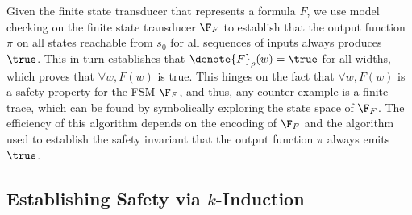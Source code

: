 Given the finite state transducer that represents a formula $F$,
we use model checking on the finite state transducer $\F_F$ to establish that the
output function $\pi$ on all states reachable from $s_0$ for all sequences of inputs always produces $\true$.
This in turn establishes that $\denote{F}_\rho(w) = \true$ for all widths,
which proves that $\forall w, F(w)$ is true.
This hinges on the fact that $\forall w, F(w)$ is a safety property for the FSM
$\F_F$, and thus, any counter-example is a finite trace, which can be found by
symbolically exploring the state space of $\F_F$. The efficiency of this
algorithm depends on the encoding of $\F_F$ and the algorithm used to establish
the safety invariant that the output function $\pi$ always emits $\true$.

\subsection{Establishing Safety via \texorpdfstring{$k$}{k}-Induction}

